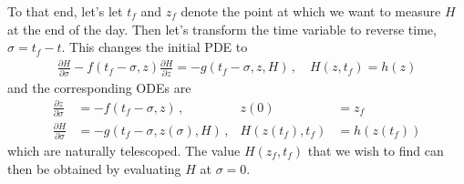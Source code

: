 \documentclass[11pt]{article}
\begin{document}
To that end, let's let $t_f$ and $z_f$ denote the point at which we want to measure $H$ at the end of the day. Then let's transform the time variable to reverse time, $\sigma = t_f - t$. This changes the initial PDE to
\begin{align}
\frac{\partial H}{\partial \sigma} - f(t_f-\sigma,z) \frac{\partial H}{\partial z} = -g(t_f-\sigma,z,H) \, , \quad H(z,t_f) = h(z) 
\end{align}
and the corresponding ODEs are
\begin{align}
\frac{\partial z}{\partial \sigma} & = - f(t_f-\sigma,z) \, , & z(0) & = z_f \\
\frac{\partial H}{\partial \sigma} & = - g(t_f-\sigma,z(\sigma),H) \, , & H(z(t_f),t_f) & = h(z(t_f)) 
\end{align}
which are naturally telescoped. The value $H(z_f,t_f)$ that we wish to find can then be obtained by evaluating $H$ at $\sigma=0$. 
\end{document}
